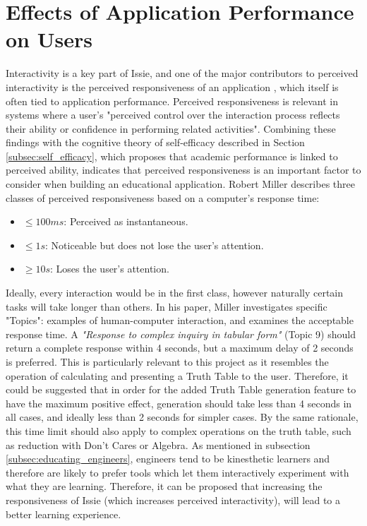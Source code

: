 \section{Effects of Application Performance on Users} \label{sec:perfeffects}
Interactivity is a key part of Issie, and one of the major contributors to perceived interactivity is the perceived responsiveness of an application \cite{interactiveWu}, which itself is often tied to application performance. Perceived responsiveness is relevant in systems where a user's "perceived control over the interaction process reflects their ability or confidence in performing related activities". Combining these findings with the cognitive theory of self-efficacy described in Section \ref{subsec:self_efficacy}, which proposes that academic performance is linked to perceived ability, indicates that perceived responsiveness is an important factor to consider when building an educational application. Robert Miller \cite{Miller1968ResponseTI} describes three classes of perceived responsiveness based on a computer's response time:
\begin{itemize}
    \item $\leq 100ms$: Perceived as instantaneous.
    \item $\leq 1s$: Noticeable but does not lose the user's attention.
    \item $\geq 10s$: Loses the user's attention.
\end{itemize}

Ideally, every interaction would be in the first class, however naturally certain tasks will take longer than others. In his paper, Miller investigates specific "Topics": examples of human-computer interaction, and examines the acceptable response time. A \textit{"Response to complex inquiry in tabular form"} (Topic 9) should return a complete response within 4 seconds, but a maximum delay of 2 seconds is preferred. This is particularly relevant to this project as it resembles the operation of calculating and presenting a Truth Table to the user. Therefore, it could be suggested that in order for the added Truth Table generation feature to have the maximum positive effect, generation should take less than 4 seconds in all cases, and ideally less than 2 seconds for simpler cases. By the same rationale, this time limit should also apply to complex operations on the truth table, such as reduction with Don't Cares or Algebra.
As mentioned in subsection \ref{subsec:educating_engineers}, engineers tend to be kinesthetic learners and therefore are likely to prefer tools which let them interactively experiment with what they are learning. Therefore, it can be proposed that increasing the responsiveness of Issie (which increases perceived interactivity), will lead to a better learning experience.


